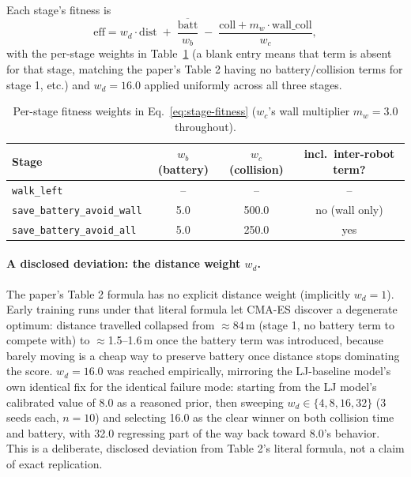 \documentclass[11pt]{article}
\begin{document}
\noindent Each stage's fitness is
\begin{equation}
\text{eff} = w_d \cdot \text{dist} \;+\; \frac{\overline{\text{batt}}}{w_b} \;-\; \frac{\text{coll} + m_w \cdot \text{wall\_coll}}{w_c},
\label{eq:stage-fitness}
\end{equation}
with the per-stage weights in Table~\ref{tab:stage-weights} (a blank entry means that term is
absent for that stage, matching the paper's Table 2 having no battery/collision terms for stage
1, etc.) and $w_d=16.0$ applied uniformly across all three stages.

\begin{table}[h]
\centering
\caption{Per-stage fitness weights in Eq.~\ref{eq:stage-fitness} ($w_c$'s wall multiplier $m_w=3.0$ throughout).}
\label{tab:stage-weights}
\begin{tabular}{@{}lccc@{}}
\toprule
Stage & $w_b$ (battery) & $w_c$ (collision) & incl.\ inter-robot term? \\
\midrule
\texttt{walk\_left} & -- & -- & -- \\
\texttt{save\_battery\_avoid\_wall} & 5.0 & 500.0 & no (wall only) \\
\texttt{save\_battery\_avoid\_all} & 5.0 & 250.0 & yes \\
\bottomrule
\end{tabular}
\end{table}

\paragraph{A disclosed deviation: the distance weight $w_d$.} The paper's Table 2 formula has
no explicit distance weight (implicitly $w_d=1$). Early training runs under that literal
formula let CMA-ES discover a degenerate optimum: distance travelled collapsed from
$\approx$84\,m (stage 1, no battery term to compete with) to $\approx$1.5--1.6\,m once the
battery term was introduced, because barely moving is a cheap way to preserve battery once
distance stops dominating the score. $w_d=16.0$ was reached empirically, mirroring the
LJ-baseline model's own identical fix for the identical failure mode: starting from the LJ
model's calibrated value of 8.0 as a reasoned prior, then sweeping $w_d \in \{4, 8, 16, 32\}$
(3 seeds each, $n=10$) and selecting 16.0 as the clear winner on both collision time and
battery, with 32.0 regressing part of the way back toward 8.0's behavior. This is a deliberate,
disclosed deviation from Table 2's literal formula, not a claim of exact replication.
\end{document}
